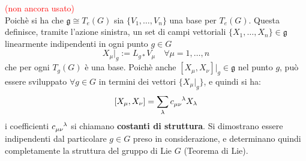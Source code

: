 \textcolor{red}{(non ancora usato)}\\
Poichè si ha che $\mathfrak{g} \cong T_e(G)$ sia $\{ V_1,\dots,V_n \}$ una base
per $T_e(G)$. Questa definisce, tramite l'azione sinistra, un set di campi vettoriali
$\{ X_1, \dots, X_n \} \in \mathfrak{g}$ linearmente indipendenti in ogni punto $g \in G$
$$
   X_\mu |_g := L_{g*}V_\mu \quad \forall \mu = 1,\dots,n
$$
che per ogni $T_g(G)$ è una base. Poichè anche $[X_\mu,X_\nu]|_g \in \mathfrak{g}$
nel punto $g$, può essere sviluppato $ \forall g \in G$ in termini dei vettori
$\{X_\mu|_g\}$, e quindi si ha:
$$
   [X_\mu,X_\nu] = \sum_\lambda c_{\mu\nu}^{\hphantom{\mu\nu}\lambda} X_\lambda
$$
i coefficienti $c_{\mu\nu}^{\hphantom{\mu\nu}\lambda}$ si chiamano
\textbf{costanti di struttura}.
Si dimostrano essere indipendenti dal particolare $g \in G$ preso in considerazione,
e determinano quindi completamente la struttura del gruppo di Lie $G$ (Teorema di Lie).\\


